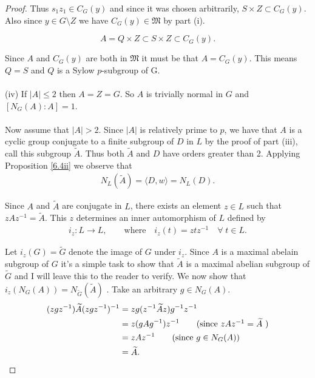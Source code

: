 \documentclass[a4paper , 11pt]{book}
\theoremstyle{definition}
\theoremstyle{remark}
\begin{document}
\begin{proof}
Thus $s_1z_1 \in C_G(y)$ and since it was chosen arbitrarily, $S \times Z \subset C_G(y)$. Also since $y \in G \! \setminus \! Z$ we have $C_G(y) \in \mathfrak{M}$ by part (i).

\begin{equation*}
A = Q \times Z \subset S \times Z \subset C_G(y).
\end{equation*}

Since $A$ and $C_G(y)$ are both in $\mathfrak{M}$ it must be that $A = C_G(y)$. This means $Q = S$ and $Q$ is a Sylow $p$-subgroup of G.\\
\\
(iv) If $|A| \leq 2$ then $A=Z=G$. So $A$ is trivially normal in $G$ and $[N_G(A): A] = 1$. \\
\\
Now assume that $|A| > 2$. Since $|A|$ is relatively prime to $p$, we have that $A$ is a cyclic group conjugate to a finite subgroup of $D$ in $L$ by the proof of part (iii), call this subgroup ${\widetilde{A}}$. Thus both ${\widetilde{A}}$ and $D$ have orders greater than 2. Applying Proposition \ref{6.4ii} we observe that
\begin{align}\label{norm1}  N_L({\widetilde{A}}) = \langle D , w \rangle = N_L(D).
\end{align}

Since $A$ and ${\widetilde{A}}$ are conjugate in $L$, there exists an element $z \in L$ such that $zAz^{-1} = {\widetilde{A}}$. This $z$ determines an inner automorphism of $L$ defined by
\begin{align*} i_z: L \longrightarrow L,  \qquad \text{where} \quad \!  i_z(t) = z t z^{-1}  \quad \forall \; t \in L.
\end{align*}

Let $i_z(G) = {\widetilde{G}}$ denote the image of $G$ under $i_z$. Since $A$ is a maximal abelain subgroup of $G$ it's a simple task to show that ${\widetilde{A}}$ is a maximal abelian subgroup of ${\widetilde{G}}$ and I will leave this to the reader to verify. We now show that $i_z(N_G(A)) = N_{\widetilde{G}}({\widetilde{A}})$ . Take an arbitrary $g \in N_G(A)$.
\begin{align*} (z g z^{-1}) {\widetilde{A}} (z g z^{-1})^{-1} &= z g (z^{-1} {\widetilde{A}} z) g^{-1} z^{-1}
\\ &=  z (g A g^{-1}) z^{-1} \tag{since $zAz^{-1} = {\widetilde{A}}$ }
\\ &= z A z^{-1} \tag{since $g \in N_G(A)$}
\\ &= {\widetilde{A}}.
\end{align*}


\end{proof}
\end{document}
